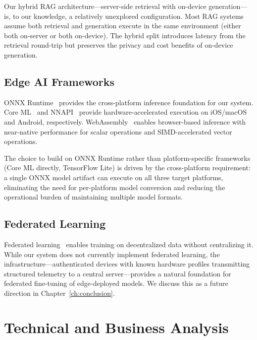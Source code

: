 \documentclass[12pt, letterpaper, twoside]{report}
\begin{document}
Our hybrid RAG architecture---server-side retrieval with on-device generation---is, to our knowledge, a relatively unexplored configuration. Most RAG systems assume both retrieval and generation execute in the same environment (either both on-server or both on-device). The hybrid split introduces latency from the retrieval round-trip but preserves the privacy and cost benefits of on-device generation.

\section{Edge AI Frameworks}
\label{sec:related_frameworks}

ONNX Runtime~\cite{onnxruntime2019} provides the cross-platform inference foundation for our system. Core ML~\cite{coreml2017} and NNAPI~\cite{nnapi2017} provide hardware-accelerated execution on iOS/macOS and Android, respectively. WebAssembly~\cite{wasm2017} enables browser-based inference with near-native performance for scalar operations and SIMD-accelerated vector operations.

The choice to build on ONNX Runtime rather than platform-specific frameworks (Core ML directly, TensorFlow Lite) is driven by the cross-platform requirement: a single ONNX model artifact can execute on all three target platforms, eliminating the need for per-platform model conversion and reducing the operational burden of maintaining multiple model formats.

\section{Federated Learning}
\label{sec:related_federated}

Federated learning~\cite{mcmahan2017federated, konecny2016federated, li2020federated, bonawitz2019towards} enables training on decentralized data without centralizing it. While our system does not currently implement federated learning, the infrastructure---authenticated devices with known hardware profiles transmitting structured telemetry to a central server---provides a natural foundation for federated fine-tuning of edge-deployed models. We discuss this as a future direction in Chapter~\ref{ch:conclusion}.

\chapter{Technical and Business Analysis}
\label{ch:business}
\end{document}
